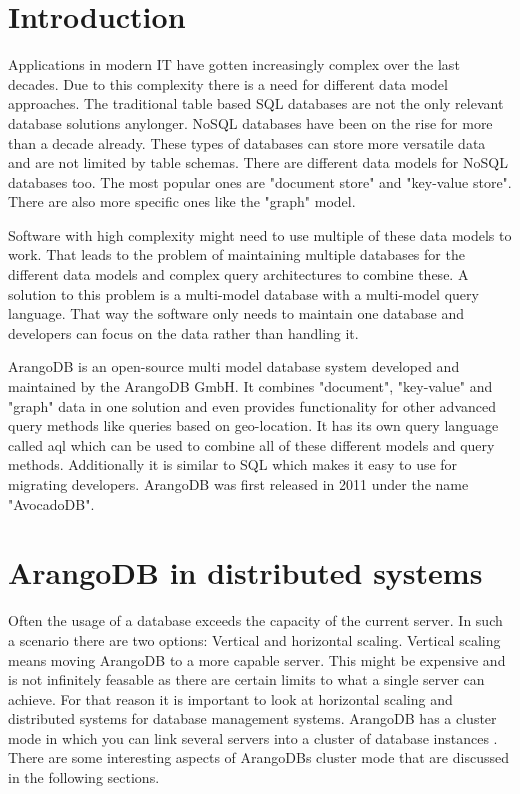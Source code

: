 
\section{Introduction}

Applications in modern IT have gotten increasingly complex over the last decades. Due to this complexity there is a need for different data model approaches. The traditional table based SQL databases are not the only relevant database solutions anylonger. NoSQL databases have been on the rise for more than a decade already. These types of databases can store more versatile data and are not limited by table schemas. There are different data models for NoSQL databases too. The most popular ones are "document store" and "key-value store". There are also more specific ones like the "graph" model.

Software with high complexity might need to use multiple of these data models to work. That leads to the problem of maintaining multiple databases for the different data models and complex query architectures to combine these. A solution to this problem is a multi-model database with a multi-model query language. That way the software only needs to maintain one database and developers can focus on the data rather than handling it.

ArangoDB is an open-source multi model database system developed and maintained by the ArangoDB GmbH. It combines "document", "key-value" and "graph" data in one solution and even provides functionality for other advanced query methods like queries based on geo-location. It has its own query language called \gls{aql} which can be used to combine all of these different models and query methods. Additionally it is similar to SQL which makes it easy to use for migrating developers. ArangoDB was
first released in 2011 under the name "AvocadoDB". \parencite{ArangoHomepage}

\section{ArangoDB in distributed systems}

Often the usage of a database exceeds the capacity of the current server. In such a scenario there are two options: Vertical and horizontal scaling. Vertical scaling means moving ArangoDB to a more capable server. This might be expensive and is not infinitely feasable as there are certain limits to what a single server can achieve. For that reason it is important to look at horizontal scaling and distributed systems for database management systems. ArangoDB has a cluster mode in which you can link several servers into a cluster of database instances \parencite{ArangoCluster}. There are some interesting aspects of ArangoDBs cluster mode that are discussed in the following sections.

